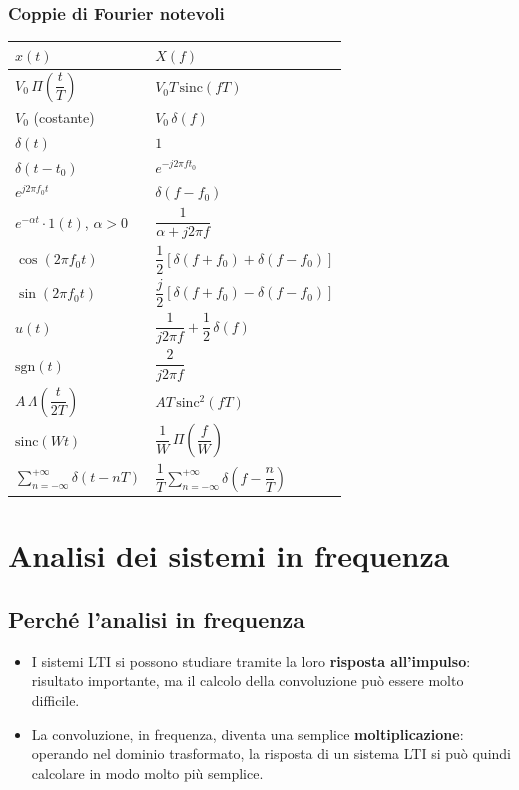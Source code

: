 \documentclass[12pt, a4paper]{article}
\begin{document}
\subsubsection{Coppie di Fourier notevoli}
\begin{center}
\renewcommand{\arraystretch}{1.7}
\begin{tabular}{ll}
\toprule
$x(t)$ & $X(f)$ \\
\midrule
$V_0\,\Pi\!\left(\dfrac tT\right)$ & $V_0T\,\text{sinc}(fT)$ \\
$V_0$ (costante) & $V_0\,\delta(f)$ \\
$\delta(t)$ & $1$ \\
$\delta(t-t_0)$ & $e^{-j2\pi ft_0}$ \\
$e^{j2\pi f_0t}$ & $\delta(f-f_0)$ \\
$e^{-\alpha t}\cdot1(t)$, $\alpha>0$ & $\dfrac{1}{\alpha+j2\pi f}$ \\
$\cos(2\pi f_0t)$ & $\dfrac12\left[\delta(f+f_0)+\delta(f-f_0)\right]$ \\
$\sin(2\pi f_0t)$ & $\dfrac j2\left[\delta(f+f_0)-\delta(f-f_0)\right]$ \\
$u(t)$ & $\dfrac{1}{j2\pi f}+\dfrac12\,\delta(f)$ \\
$\text{sgn}(t)$ & $\dfrac{2}{j2\pi f}$ \\
$A\,\Lambda\!\left(\dfrac{t}{2T}\right)$ & $AT\,\text{sinc}^2(fT)$ \\
$\text{sinc}(Wt)$ & $\dfrac1W\,\Pi\!\left(\dfrac fW\right)$ \\
$\displaystyle\sum_{n=-\infty}^{+\infty}\delta(t-nT)$ & $\dfrac1T\displaystyle\sum_{n=-\infty}^{+\infty}\delta\!\left(f-\dfrac nT\right)$ \\
\bottomrule
\end{tabular}
\end{center}



\section{Analisi dei sistemi in frequenza}

\subsection{Perché l'analisi in frequenza}
\begin{itemize}
    \item I sistemi LTI si possono studiare tramite la loro \textbf{risposta all'impulso}: risultato importante, ma il calcolo della convoluzione può essere molto difficile.
    \item La convoluzione, in frequenza, diventa una semplice \textbf{moltiplicazione}: operando nel dominio trasformato, la risposta di un sistema LTI si può quindi calcolare in modo molto più semplice.
\end{itemize}
\end{document}
